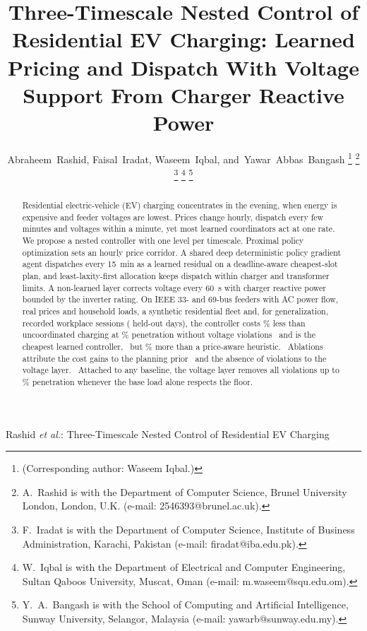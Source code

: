 \documentclass[journal]{IEEEtran}
\begin{document}
\title{Three-Timescale Nested Control of Residential EV Charging: Learned Pricing and Dispatch With Voltage Support From Charger Reactive Power}

\author{Abraheem~Rashid, Faisal~Iradat, Waseem~Iqbal, and~Yawar~Abbas~Bangash%
\thanks{(Corresponding author: Waseem Iqbal.)}%
\thanks{A.~Rashid is with the Department of Computer Science, Brunel University London,
London, U.K. (e-mail: 2546393@brunel.ac.uk).}%
\thanks{F.~Iradat is with the Department of Computer Science, Institute of Business
Administration, Karachi, Pakistan (e-mail: firadat@iba.edu.pk).}%
\thanks{W.~Iqbal is with the Department of Electrical and Computer Engineering,
Sultan Qaboos University, Muscat, Oman (e-mail: m.waseem@squ.edu.om).}%
\thanks{Y.~A.~Bangash is with the School of Computing and Artificial Intelligence,
Sunway University, Selangor, Malaysia (e-mail: yawarb@sunway.edu.my).}}

%
{Rashid \MakeLowercase{\textit{et al.}}: Three-Timescale Nested Control of Residential EV Charging}

\maketitle

\begin{abstract}
Residential electric-vehicle (EV) charging concentrates in the evening, when
energy is expensive and feeder voltages are lowest. Prices change hourly,
dispatch every few minutes and voltages within a minute, yet most learned
coordinators act at one rate. We propose a
nested controller with one level per timescale. Proximal policy optimization
sets an hourly price corridor. A shared deep deterministic policy
gradient agent dispatches every \SI{15}{min} as a learned residual on a
deadline-aware cheapest-slot plan, and least-laxity-first allocation keeps
dispatch within charger and transformer limits. A non-learned layer
corrects voltage every \SI{60}{s} with charger reactive power bounded by the
inverter rating. On IEEE 33- and 69-bus feeders with AC power flow, real
prices and household loads, a synthetic residential fleet and, for
generalization, recorded workplace sessions (\GEvalDays{} held-out days), the
controller costs \GSavingNestedUncSThree\% less than uncoordinated charging at
\GPenSThree\% penetration without voltage violations%
\ and is the cheapest learned controller,%
\ but \GGapNestedPaSThree\% more than a price-aware heuristic.%
\ Ablations attribute the cost gains to the planning prior%
\ and the absence of violations to the voltage layer.%
\ Attached to any baseline, the voltage layer removes all
violations up to \GPenSFive\% penetration whenever the base load alone respects
the floor.%
\end{abstract}
\end{document}

